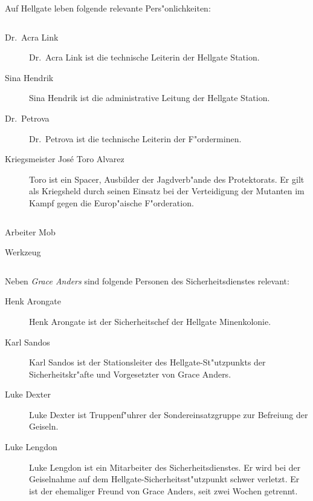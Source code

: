 
Auf Hellgate leben folgende relevante Pers"onlichkeiten:

\begin{column}[l]{0.45}
    \begin{description}
        \item[Dr.~Acra Link] Dr.~Acra Link ist die technische Leiterin der Hellgate Station.
        \item[Sina Hendrik] Sina Hendrik ist die administrative Leitung der Hellgate Station.
        \item[Dr.~Petrova] Dr.~Petrova ist die technische Leiterin der F"orderminen.
        \item[Kriegsmeister Jos\'{e} \frqq{}Toro\flqq{} Alvarez] Toro ist ein Spacer, Ausbilder der Jagdverb"ande des Protektorats. Er gilt 
            als Kriegsheld durch seinen Einsatz bei der Verteidigung der Mutanten im Kampf gegen die Europ"aische F"orderation.
    \end{description}
\end{column}
\begin{column}[r]{0.45}
    \begin{nscsheet}[h]{Arbeiter Mob}
        \nscstats[]
        \nscruler
        \begin{nscinventory}
            \nscitem[Waffen] Werkzeug
        \end{nscinventory}
    \end{nscsheet}
\end{column}


Neben \emph{Grace Anders} sind folgende Personen des Sicherheitsdienstes relevant:

\begin{description}
    \item[Henk Arongate] Henk Arongate ist der Sicherheitschef der Hellgate Minenkolonie.
    \item[Karl Sandos] Karl Sandos ist der Stationsleiter des Hellgate-St"utzpunkts der Sicherheitskr"afte und Vorgesetzter von Grace 
        Anders.
    \item[Luke Dexter] Luke Dexter ist Truppenf"uhrer der Sondereinsatzgruppe zur Befreiung der Geiseln.
    \item[Luke Lengdon] Luke Lengdon ist ein Mitarbeiter des Sicherheitsdienstes. Er wird bei der Geiselnahme auf dem 
        Hellgate-Sicherheitsst"utzpunkt schwer verletzt. Er ist der ehemaliger Freund von Grace Anders, seit zwei Wochen getrennt.
\end{description}

\vfill\pagebreak